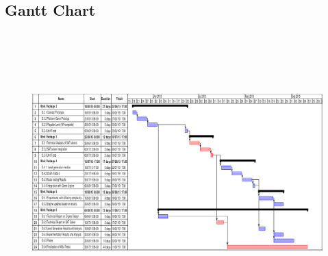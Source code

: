 \documentclass[a4paper]{article}
\begin{document}
\begin{landscape}
\subsection{Gantt Chart}
%   




% 



\begin{figure}[h]

  \centering
  \includegraphics[trim=0cm 0cm 0.0cm 0.0cm, clip=true, width=9in,height=4.25in, angle=0]{gantt2}
  \label{Gantt}
\end{figure}
\pagebreak
\end{landscape}
\end{document}
